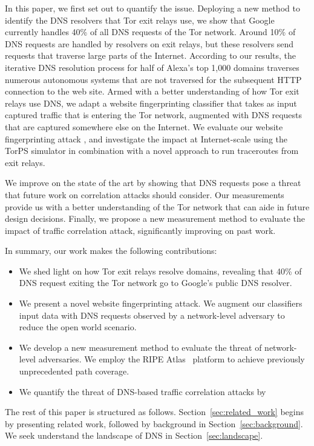 In this paper, we first set out to quantify the issue.  Deploying a new method
to identify the DNS resolvers that Tor exit relays use, we show that Google
currently handles 40\% of all DNS requests of the Tor network.  Around 10\% of
DNS requests are handled by resolvers on exit relays, but these resolvers send
requests that traverse large parts of the Internet.  According to our results,
the iterative DNS resolution process for half of Alexa's top 1,000 domains
traverses numerous autonomous systems that are not traversed for the subsequent
HTTP connection to the web site.  Armed with a better understanding of how Tor
exit relays use DNS, we adapt a website fingerprinting classifier that takes as
input captured traffic that is entering the Tor network, augmented with DNS
requests that are captured somewhere else on the Internet.  We evaluate our
website fingerprinting attack
, and investigate the impact at Internet-scale
using the TorPS simulator in combination with a novel approach to run
traceroutes from exit relays.

We improve on the state of the art by showing that DNS requests pose a threat
that future work on correlation attacks should consider.  Our measurements
provide us with a better understanding of the Tor network that can aide in
future design decisions.  Finally, we propose a new measurement method to
evaluate the impact of traffic correlation attack, significantly improving on
past work.

In summary, our work makes the following contributions:
\begin{itemize}
	\item We shed light on how Tor exit relays resolve domains, revealing that
		40\% of DNS request exiting the Tor network go to Google's public DNS
		resolver.

	\item We present a novel website fingerprinting attack.  We augment our
		classifiers input data with DNS requests observed by a network-level
		adversary to reduce the open world scenario.

	\item We develop a new measurement method to evaluate the threat of
		network-level adversaries.  We employ the RIPE Atlas~\cite{atlas}
		platform to achieve previously unprecedented path coverage.

	\item We quantify the threat of DNS-based traffic correlation attacks by
\end{itemize}

The rest of this paper is structured as follows.
Section~\ref{sec:related_work} begins by presenting related work, followed by
background in Section~\ref{sec:background}.  We seek understand the landscape
of DNS in Section~\ref{sec:landscape}.
